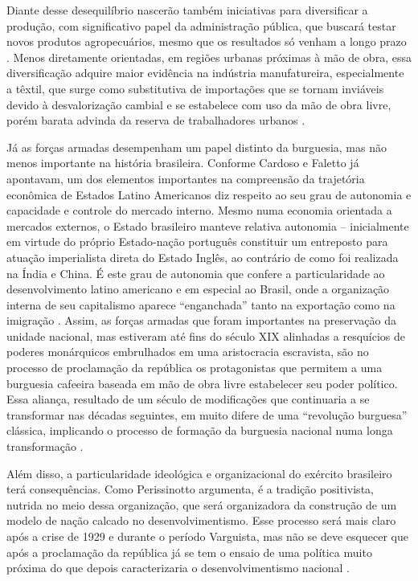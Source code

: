 Diante desse desequilíbrio nascerão também iniciativas para diversificar
a produção, com significativo papel da administração pública, que
buscará testar novos produtos agropecuários, mesmo que os resultados só
venham a longo prazo
\citep{pradojunior2012}.
Menos diretamente orientadas, em regiões urbanas próximas à mão de obra,
essa diversificação adquire maior evidência na indústria manufatureira,
especialmente a têxtil, que surge como substitutiva de importações que
se tornam inviáveis devido à desvalorização cambial e se estabelece com
uso da mão de obra livre, porém barata advinda da reserva de
trabalhadores urbanos \cite{pedreira_historiografia_2024}.

Já as forças armadas desempenham um papel distinto da burguesia, mas não
menos importante na história brasileira. Conforme Cardoso e Faletto
\citep{cardoso_dependencia_1970} já apontavam, um dos elementos importantes na compreensão da
trajetória econômica de Estados Latino Americanos diz respeito ao seu
grau de autonomia e capacidade e controle do mercado interno. Mesmo numa economia orientada a
mercados externos, o Estado brasileiro manteve relativa autonomia --
inicialmente em virtude do próprio Estado-nação português constituir um
entreposto para atuação imperialista direta do Estado Inglês, ao
contrário de como foi realizada na Índia e China. É este grau de
autonomia que confere a particularidade ao desenvolvimento latino
americano e em especial ao Brasil, onde a organização interna de seu
capitalismo aparece ``enganchada'' tanto na exportação como na imigração
\citep{mello1982}. Assim,
as forças armadas que foram importantes na preservação da unidade
nacional, mas estiveram até fins do século XIX alinhadas a resquícios de
poderes monárquicos embrulhados em uma aristocracia escravista, são no
processo de proclamação da república os protagonistas que permitem a uma
burguesia cafeeira baseada em mão de obra livre estabelecer seu poder
político. Essa aliança, resultado de um século de modificações que 
continuaria a se transformar nas décadas seguintes, em muito difere de
uma ``revolução burguesa'' clássica, implicando o processo de formação
da burguesia nacional numa longa transformação \citep{fernandes2020}.

Além disso, a particularidade ideológica e organizacional do
exército brasileiro terá consequências. Como Perissinotto \citeyearpar{perissinotto_ideias_2023}
argumenta, é a tradição positivista, nutrida no meio dessa
organização, que será organizadora da construção de um modelo de nação
calcado no desenvolvimentismo. Esse processo será mais claro após a
crise de 1929 e durante o período Varguista, mas não se deve esquecer
que após a proclamação da república já se tem o ensaio de uma política
muito próxima do que depois caracterizaria o desenvolvimentismo nacional
\cite{perissinotto_ideias_2023}.

